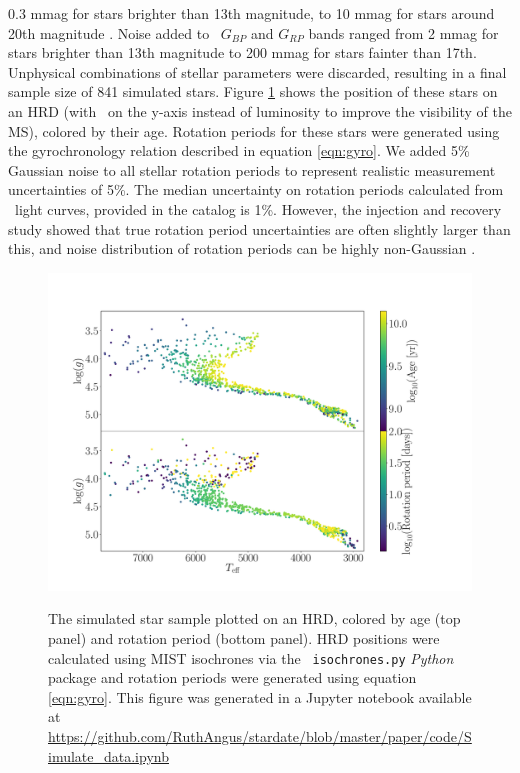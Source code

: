0.3 mmag for stars brighter than 13th magnitude, to 10 mmag for stars
around 20th magnitude \citep{evans2017, brown2018}.
Noise added to \gaia\ $G_{BP}$ and $G_{RP}$ bands ranged from 2 mmag for stars
brighter than 13th magnitude to 200 mmag for stars fainter than 17th.
Unphysical combinations of stellar parameters were discarded, resulting in a
final sample size of 841 simulated stars.
Figure \ref{fig:CMD_age} shows the position of these stars on an HRD
(with \logg\ on the y-axis instead of luminosity to improve the visibility of
the MS), colored by their age.
Rotation periods for these stars were generated using the gyrochronology
relation described in equation \ref{eqn:gyro}.
We added 5\% Gaussian noise to all stellar rotation periods to represent
realistic measurement uncertainties of 5\%.
The median uncertainty on rotation periods calculated from \kepler\ light
curves, provided in the \citet{mcquillan2014} catalog is 1\%.
However, the \citet{aigrain2015} injection and recovery study showed that true
rotation period uncertainties are often slightly larger than this, and noise
distribution of rotation periods can be highly non-Gaussian
\citep[\eg][]{aigrain2015, angus2018}.
\begin{figure}
  \caption{
      The simulated star sample plotted on an HRD, colored by age
    (top panel) and rotation period (bottom panel).
    HRD positions were calculated using MIST isochrones via the {\tt
    isochrones.py} {\it Python} package and rotation periods were generated
    using equation \ref{eqn:gyro}.
    This figure was generated in a Jupyter notebook available at
    \url{https://github.com/RuthAngus/stardate/blob/master/paper/code/Simulate_data.ipynb}
}
  \centering
    \includegraphics[width=1\textwidth]{simulated_CMD}
\label{fig:CMD_age}
\end{figure}
